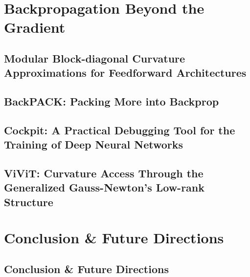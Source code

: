 
\part{Backpropagation Beyond the Gradient}\label{part:papers}

\setchapterpreamble[u]{\margintoc}
\chapter{Modular Block-diagonal Curvature Approximations for Feedforward
  Architectures}\label{chap:hbp}


\setchapterpreamble[u]{\margintoc}
\chapter{BackPACK: Packing More into Backprop}\label{chap:backpack}


\setchapterpreamble[u]{\margintoc}
\chapter{Cockpit: A Practical Debugging Tool for the Training of Deep
  Neural Networks}\label{chap:cockpit}


\setchapterpreamble[u]{\margintoc}
\chapter[ViViT: Curvature Access Through the \ggn's Low-rank Structure]{ViViT:
  Curvature Access Through the Generalized Gauss-Newton's Low-rank
  Structure}\label{chap:vivit}



\part{Conclusion \& Future Directions}\label{part:conclusion}

\setchapterpreamble[u]{\margintoc}
\chapter{Conclusion \& Future Directions}\label{chap:conclusion}


